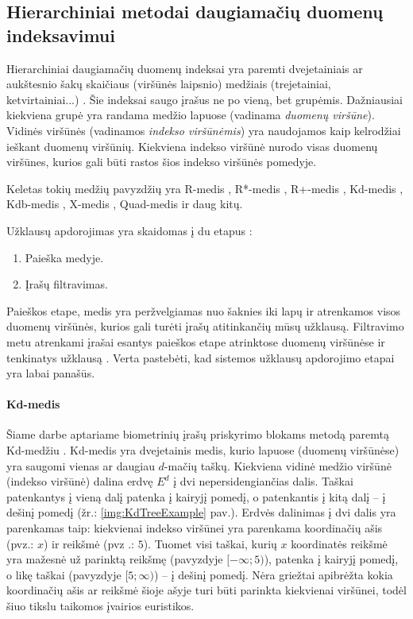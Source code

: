 \subsection{Hierarchiniai metodai daugiamačių duomenų indeksavimui}
\label{sec:HierarchicalIndices}

Hierarchiniai daugiamačių duomenų indeksai yra paremti dvejetainiais ar aukštesnio šakų skaičiaus (viršūnės laipsnio) medžiais (trejetainiai, ketvirtainiai...) \cite{gaede1998multidimensional}.
Šie indeksai saugo įrašus ne po vieną, bet grupėmis.
Dažniausiai kiekviena grupė yra randama medžio lapuose (vadinama {\it duomenų viršūne}).
Vidinės viršūnės (vadinamos {\it indekso viršūnėmis}) yra naudojamos kaip kelrodžiai ieškant duomenų viršūnių.
Kiekviena indekso viršūnė nurodo visas duomenų viršūnes, kurios gali būti rastos šios indekso viršūnės pomedyje.

Keletas tokių medžių pavyzdžių yra R-medis \cite{guttman1984r}, R*-medis \cite{beckmann1990r}, R+-medis \cite{sellis1987r+}, Kd-medis \cite{bentley1979multidimensional}, Kdb-medis \cite{robinson1981kdb}, X-medis \cite{berchtold1996x}, Quad-medis \cite{habenicht1983quad} ir daug kitų.

Užklausų apdorojimas yra skaidomas į du etapus \cite{bohm2001searching}:
\begin{enumerate}
	\item Paieška medyje.
	\item Įrašų filtravimas.
\end{enumerate}
Paieškos etape, medis yra peržvelgiamas nuo šaknies iki lapų ir atrenkamos visos duomenų viršūnės, kurios gali turėti įrašų atitinkančių mūsų užklausą.
Filtravimo metu atrenkami įrašai esantys paieškos etape atrinktose duomenų viršūnėse ir tenkinatys užklausą \cite{brinkhoff1994multi} \cite{bohm2001searching}.
Verta pastebėti, kad sistemos \cite{NeurotechnologyMegamatcherAccelerator} užklausų apdorojimo etapai yra labai panašūs.

\paragraph{Kd-medis}
\label{sec:Kd-tree}

Šiame darbe aptariame biometrinių įrašų priskyrimo blokams metodą paremtą Kd-medžiu \cite{bentley1979multidimensional}.
Kd-medis yra dvejetainis medis, kurio lapuose (duomenų viršūnėse) yra saugomi vienas ar daugiau $d$-mačių taškų.
Kiekviena vidinė medžio viršūnė (indekso viršūnė) dalina erdvę $E^d$ į dvi nepersidengiančias dalis.
Taškai patenkantys į vieną dalį patenka į kairyjį pomedį, o patenkantis į kitą dalį -- į dešinį pomedį (žr.: \ref{img:KdTreeExample} pav.).
Erdvės dalinimas į dvi dalis yra parenkamas taip: kiekvienai indekso viršūnei yra parenkama koordinačių ašis (pvz.: $x$) ir reikšmė (pvz .: $5$).
Tuomet visi taškai, kurių $x$ koordinatės reikšmė yra mažesnė už parinktą reikšmę (pavyzdyje $[-\infty; 5)$), patenka į kairyjį pomedį, o likę taškai (pavyzdyje $[5; \infty)$) -- į dešinį pomedį.
Nėra griežtai apibrėžta kokia koordinačių ašis ar reikšmė šioje ašyje turi būti parinkta kiekvienai viršūnei, todėl šiuo tikslu taikomos įvairios euristikos.

